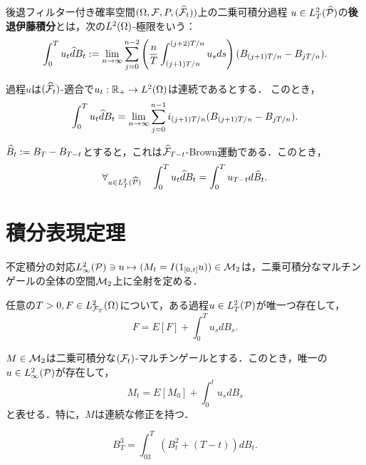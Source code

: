 \documentclass[uplatex,dvipdfmx]{jsreport}
\begin{document}
\begin{definition}
    後退フィルター付き確率空間$(\Om,\F,P,(\wh{\F}_t))$上の二乗可積分過程
    $u\in L^2_T(\wh{\P})$の\textbf{後退伊藤積分}とは，次の$L^2(\Om)$-極限をいう：
    \[\int^T_0u_t\wh{d}B_t:=\lim_{n\to\infty}\sum^{n-2}_{j=0}\paren{\frac{n}{T}\int^{(j+2)T/n}_{(j+1)T/n}u_sds}(B_{(j+1)T/n}-B_{jT/n}).\]
\end{definition}

\begin{proposition}[後退Riemann和の極限としての特徴付け]
    過程$u$は$(\wh{\F}_t)$-適合で$u_t:\R_+\to L^2(\Om)$は連続であるとする．
    このとき，
    \[\int^T_0u_t\wh{d}B_t=\lim_{n\to\infty}\sum^{n-1}_{j=0}i_{(j+1)T/n}(B_{(j+1)T/n}-B_{jT/n}).\]
\end{proposition}

\begin{proposition}[伊藤積分への帰着]
    $\wh{B}_t:=B_T-B_{T-t}$とすると，これは$\wh{\F}_{T-t}$-Brown運動である．このとき，
    \[\forall_{u\in L^2_T(\wh{\P})}\quad\int^T_0u_t\wh{d}B_t=\int^T_0u_{T-t}d\wh{B}_t.\]
\end{proposition}

\section{積分表現定理}

\begin{tcolorbox}[colframe=ForestGreen, colback=ForestGreen!10!white,breakable,colbacktitle=ForestGreen!40!white,coltitle=black,fonttitle=\bfseries\sffamily,
title=]
    不定積分の対応$L^2_\infty(\P)\ni u\mapsto(M_t=I(1_{[0,t]}u))\in\M_2$は，二乗可積分なマルチンゲールの全体の空間$\M_2$上に全射を定める．
\end{tcolorbox}

\begin{theorem}
    任意の$T>0, F\in L^2_{\F_T}(\Om)$について，ある過程$u\in L^2_T(\P)$が唯一つ存在して，
    \[F=E[F]+\int^T_0u_sdB_s.\]
\end{theorem}

\begin{corollary}
    $M\in\M_2$は二乗可積分な$(\F_t)$-マルチンゲールとする．このとき，唯一の$u\in L^2_\infty(\P)$が存在して，
    \[M_t=E[M_0]+\int^t_0u_sdB_s\]
    と表せる．特に，$M$は連続な修正を持つ．
\end{corollary}

\begin{example}
    \[B^3_T=\int^T_03(B_t^2+(T-t))dB_t.\]
\end{example}
\end{document}
